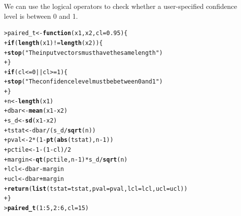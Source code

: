 \documentclass[12pt,oneside]{book}\usepackage[]{graphicx}\usepackage[]{color}
\makeatletter
\newcommand{\hlnum}[1]{\textcolor[rgb]{0.686,0.059,0.569}{#1}}%
\newcommand{\hlstr}[1]{\textcolor[rgb]{0.192,0.494,0.8}{#1}}%
\newcommand{\hlopt}[1]{\textcolor[rgb]{0,0,0}{#1}}%
\newcommand{\hlstd}[1]{\textcolor[rgb]{0.345,0.345,0.345}{#1}}%
\newcommand{\hlkwa}[1]{\textcolor[rgb]{0.161,0.373,0.58}{\textbf{#1}}}%
\newcommand{\hlkwb}[1]{\textcolor[rgb]{0.69,0.353,0.396}{#1}}%
\newcommand{\hlkwc}[1]{\textcolor[rgb]{0.333,0.667,0.333}{#1}}%
\newcommand{\hlkwd}[1]{\textcolor[rgb]{0.737,0.353,0.396}{\textbf{#1}}}%
\newenvironment{kframe}{%
 \def\at@end@of@kframe{}%
 \ifinner\ifhmode%
  \def\at@end@of@kframe{\end{minipage}}%
  \begin{minipage}{\columnwidth}%
 \fi\fi%
 \def\FrameCommand##1{\hskip\@totalleftmargin \hskip-\fboxsep
 \colorbox{shadecolor}{##1}\hskip-\fboxsep
     \hskip-\linewidth \hskip-\@totalleftmargin \hskip\columnwidth}%
 \MakeFramed {\advance\hsize-\width
   \@totalleftmargin\z@ \linewidth\hsize
   \@setminipage}}%
 {\par\unskip\endMakeFramed%
 \at@end@of@kframe}
\newenvironment{knitrout}{}{} %
\makeatother
\begin{document}
We can use the logical operators to check whether a user-specified confidence level is between 0 and 1.

\begin{knitrout}
\color{fgcolor}\begin{kframe}
\begin{alltt}
\hlstd{> }\hlstd{paired_t} \hlkwb{<-} \hlkwa{function}\hlstd{(}\hlkwc{x1}\hlstd{,} \hlkwc{x2}\hlstd{,} \hlkwc{cl} \hlstd{=} \hlnum{0.95}\hlstd{) \{}
\hlstd{+ }    \hlkwa{if} \hlstd{(}\hlkwd{length}\hlstd{(x1)} \hlopt{!=} \hlkwd{length}\hlstd{(x2)) \{}
\hlstd{+ }        \hlkwd{stop}\hlstd{(}\hlstr{"The input vectors  must have the same length"}\hlstd{)}
\hlstd{+ }    \hlstd{\}}
\hlstd{+ }    \hlkwa{if} \hlstd{(cl} \hlopt{<=} \hlnum{0} \hlopt{||} \hlstd{cl} \hlopt{>=} \hlnum{1}\hlstd{) \{}
\hlstd{+ }        \hlkwd{stop}\hlstd{(}\hlstr{"The confidence level must be between 0 and 1"}\hlstd{)}
\hlstd{+ }    \hlstd{\}}
\hlstd{+ }    \hlstd{n} \hlkwb{<-} \hlkwd{length}\hlstd{(x1)}
\hlstd{+ }    \hlstd{dbar} \hlkwb{<-} \hlkwd{mean}\hlstd{(x1} \hlopt{-} \hlstd{x2)}
\hlstd{+ }    \hlstd{s_d} \hlkwb{<-} \hlkwd{sd}\hlstd{(x1} \hlopt{-} \hlstd{x2)}
\hlstd{+ }    \hlstd{tstat} \hlkwb{<-} \hlstd{dbar}\hlopt{/}\hlstd{(s_d}\hlopt{/}\hlkwd{sqrt}\hlstd{(n))}
\hlstd{+ }    \hlstd{pval} \hlkwb{<-} \hlnum{2} \hlopt{*} \hlstd{(}\hlnum{1} \hlopt{-} \hlkwd{pt}\hlstd{(}\hlkwd{abs}\hlstd{(tstat), n} \hlopt{-} \hlnum{1}\hlstd{))}
\hlstd{+ }    \hlstd{pctile} \hlkwb{<-} \hlnum{1} \hlopt{-} \hlstd{(}\hlnum{1} \hlopt{-} \hlstd{cl)}\hlopt{/}\hlnum{2}
\hlstd{+ }    \hlstd{margin} \hlkwb{<-} \hlkwd{qt}\hlstd{(pctile, n} \hlopt{-} \hlnum{1}\hlstd{)} \hlopt{*} \hlstd{s_d}\hlopt{/}\hlkwd{sqrt}\hlstd{(n)}
\hlstd{+ }    \hlstd{lcl} \hlkwb{<-} \hlstd{dbar} \hlopt{-} \hlstd{margin}
\hlstd{+ }    \hlstd{ucl} \hlkwb{<-} \hlstd{dbar} \hlopt{+} \hlstd{margin}
\hlstd{+ }    \hlkwd{return}\hlstd{(}\hlkwd{list}\hlstd{(}\hlkwc{tstat} \hlstd{= tstat,} \hlkwc{pval} \hlstd{= pval,} \hlkwc{lcl} \hlstd{= lcl,} \hlkwc{ucl} \hlstd{= ucl))}
\hlstd{+ }\hlstd{\}}
\hlstd{> }\hlkwd{paired_t}\hlstd{(}\hlnum{1}\hlopt{:}\hlnum{5}\hlstd{,} \hlnum{2}\hlopt{:}\hlnum{6}\hlstd{,} \hlkwc{cl} \hlstd{=} \hlnum{15}\hlstd{)}
\end{alltt}


{\ttfamily\noindent\bfseries\color{errorcolor}{Error in paired\_t(1:5, 2:6, cl = 15): The confidence level must be between 0 and 1}}\end{kframe}
\end{knitrout}
\end{document}

